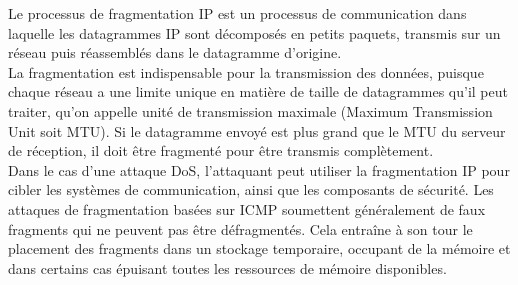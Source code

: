 	Le processus de fragmentation IP est un processus de communication dans laquelle les datagrammes IP sont décomposés en petits paquets, transmis sur un réseau puis réassemblés dans le datagramme d'origine.\\

	La fragmentation est indispensable pour la transmission des données, puisque chaque réseau a une limite unique en matière de taille de datagrammes qu'il peut traiter, qu’on appelle unité de transmission maximale (Maximum Transmission Unit soit MTU). Si le datagramme envoyé est plus grand que le MTU du serveur de réception, il doit être fragmenté pour être transmis complètement.\\

	Dans le cas d’une attaque DoS, l'attaquant peut utiliser la fragmentation IP pour cibler les systèmes de communication, ainsi que les composants de sécurité. Les attaques de fragmentation basées sur ICMP soumettent généralement de faux fragments qui ne peuvent pas être défragmentés. Cela entraîne à son tour le placement des fragments dans un stockage temporaire, occupant de la mémoire et dans certains cas épuisant toutes les ressources de mémoire disponibles.\\

